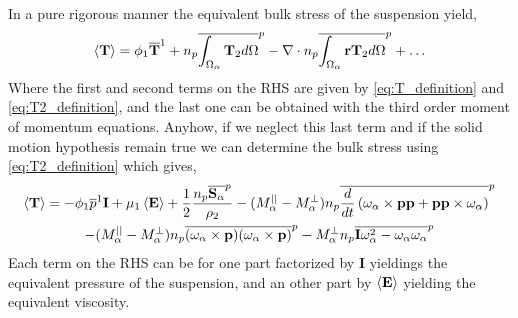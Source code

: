 In a pure rigorous manner the equivalent bulk stress of the suspension yield, 
\begin{equation*}
    \left<\textbf{T}\right> = 
    \phi_1 \overline{\textbf{T}}^1 
    + n_p\overline{\int_{\Omega_\alpha} \mathbf{T}_2 d\Omega}^{p}
    -\mathbf{\nabla}\cdot n_p\overline{\int_{\Omega_\alpha} \textbf{r}\mathbf{T}_2 d\Omega}^{p}
    + \ldots
\end{equation*}
Where the first and second terms on the RHS are given by \ref{eq:T_definition} and \ref{eq:T2_definition}, and the last one can be obtained with the third order moment of momentum equations. 
Anyhow, if we neglect this last term and if the solid motion hypothesis remain true we can determine the bulk stress using \ref{eq:T2_definition} which gives,
\begin{multline*}
    \left<\textbf{T}\right> = 
    - \phi_1\overline{p}^1\textbf{I} 
    + \mu_1 \left<\textbf{E}\right> 
    + \frac{1}{2}\frac{n_p\overline{\textbf{S}_\alpha}^{p}}{\rho_2}
    - (M_\alpha^{||} - M_\alpha^\bot) n_p\overline{\frac{d}{d t} \left(
        \omega_\alpha \times
        \textbf{pp}
        + \textbf{pp} \times \omega_\alpha
    \right)}^{p}\\
    - (M_\alpha^{||} - M_\alpha^\bot) n_p\overline{
        (\omega_\alpha \times \textbf{p}) (\omega_\alpha \times \textbf{p}) }^{p} 
    -M_\alpha^\bot n_p\overline{\textbf{I} \omega_\alpha^2 -\omega_\alpha\omega_\alpha }^{p}
\end{multline*}
Each term on the RHS can be for one part factorized by \textbf{I} yieldings the equivalent pressure of the suspension, and an other part by $\left<\textbf{E}\right>$ yielding the equivalent viscosity. 



